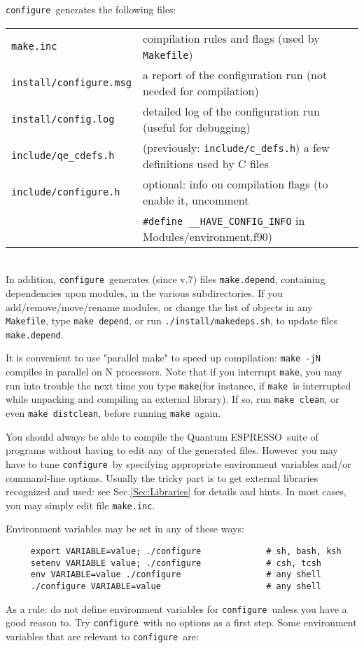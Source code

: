 \documentclass[12pt,a4paper]{article}
\def\qe{{\sc Quantum ESPRESSO}}
\def\configure{\texttt{configure}}
\def\make{\texttt{make}}
\begin{document}
\noindent \configure\ generates the following files:

\begin{tabular}{ll}
\texttt{make.inc} &      compilation rules and flags (used by \texttt{Makefile})\\
\texttt{install/configure.msg} & a report of the configuration run (not needed for compilation)\\
\texttt{install/config.log} & detailed log of the configuration run (useful for debugging)\\
	\texttt{include/qe\_cdefs.h} &  (previously: \texttt{include/c\_defs.h})
	a few definitions used by C files\\
\texttt{include/configure.h} &  optional: info on compilation flags
	(to enable it, uncomment \\ &
	\verb|#define __HAVE_CONFIG_INFO|
	 in Modules/environment.f90)\\
\end{tabular}\\
In addition, \configure\ generates (since v.7) files \texttt{make.depend},
containing dependencies upon modules, in the various subdirectories.
If you add/remove/move/rename modules, or change the list of objects
in any \texttt{Makefile}, type \texttt{make depend}, or run 
\texttt{./install/makedeps.sh}, to update files \texttt{make.depend}.

It is convenient to use "parallel make" to speed up compilation:
\texttt{make -jN} compiles in parallel on N processors. Note that
if you interrupt \make, you may run into trouble the next time you 
type \make (for instance, if \make\ is interrupted while unpacking
and compiling an external library).
If so, run \texttt{make clean}, or even \texttt{make distclean}, 
before running \make\ again.

You should always be able to compile the \qe\ suite
of programs without having to edit any of the generated files. However you
may have to tune \configure\ by specifying appropriate environment variables
and/or command-line options. Usually the tricky part is to get external
libraries recognized and used: see Sec.\ref{Sec:Libraries}
for details and hints. In most cases, you may simply edit file
\texttt{make.inc}. 

Environment variables may be set in any of these ways:
\begin{verbatim}
     export VARIABLE=value; ./configure             # sh, bash, ksh
     setenv VARIABLE value; ./configure             # csh, tcsh
     env VARIABLE=value ./configure                 # any shell
     ./configure VARIABLE=value                     # any shell
\end{verbatim}
As a rule: do not define environment variables for \configure\ unless
you have a good reason to. Try \configure\ with no options as a first step.
Some environment variables that are relevant to \configure\ are:
\end{document}
